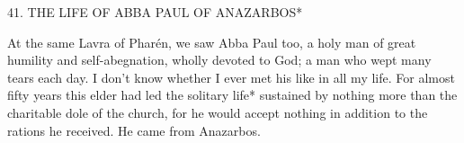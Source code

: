 41.
THE LIFE OF ABBA PAUL OF ANAZARBOS*

At the same Lavra of Pharén, we saw Abba Paul too, a holy man
of great humility and self-abegnation, wholly devoted to God; a
man who wept many tears each day.
I don't know whether I ever
met his like in all my life.
For almost fifty years this elder had led
the solitary life* sustained by nothing more than the charitable dole
of the church, for he would accept nothing in addition to the rations
he received.
He came from Anazarbos.

